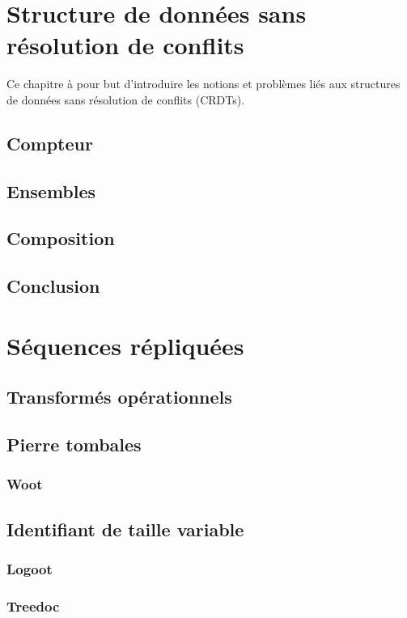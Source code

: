 \chapter{Structure de données sans résolution de conflits}

Ce chapitre à pour but d'introduire les notions et problèmes liés aux structures
de données sans résolution de conflits (CRDTs). 

\section{Compteur}
\section{Ensembles}
\section{Composition}
\section{Conclusion}

\chapter{Séquences répliquées}
\section{Transformés opérationnels}
\section{Pierre tombales}
\subsection{Woot}
\section{Identifiant de taille variable}
\subsection{Logoot}
\subsection{Treedoc}

